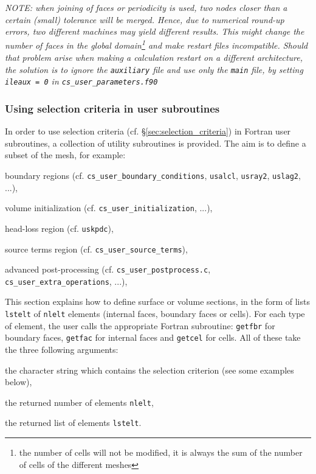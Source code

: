 {{{{\em NOTE: when joining of faces or periodicity is used, two nodes closer
than a certain (small) tolerance will be merged. Hence, due to numerical
round-up errors, two different machines may yield different results.
This might change the number of faces in the global
domain\footnote{the number of cells will not be modified, it is always the sum of the
number of cells of the different meshes} and make restart files
incompatible. Should that problem arise when making a calculation restart on a
different architecture, the solution is to ignore the \texttt{auxiliary}
file and use only the \texttt{main} file, by setting \texttt{ileaux = 0}
in \texttt{cs\_user\_parameters.f90}}

\subsubsection{Using selection criteria in user subroutines}
\label{sec:fvm_selector}

In order to use selection criteria (cf. \S\ref{sec:selection_criteria}) in Fortran
user subroutines, a collection of utility subroutines is provided. The aim is to
define a subset of the mesh, for example:

\begin{list}{-}{}
\item boundary regions (cf. \texttt{cs\_user\_boundary\_conditions}, \texttt{usalcl},
\texttt{usray2}, \texttt{uslag2}, ...),
\item volume initialization (cf. \texttt{cs\_user\_initialization}, ...),
\item head-loss region (cf. \texttt{uskpdc}),
\item source terms region (cf. \texttt{cs\_user\_source\_terms}),
\item advanced post-processing (cf. \texttt{cs\_user\_postprocess.c},
      \texttt{cs\_user\_extra\_operations}, ...),
\end{list}

This section explains how to define surface or volume sections,
in the form of lists \texttt{lstelt} of \texttt{nlelt} elements
(internal faces, boundary faces or cells).
For each type of element, the user calls the appropriate Fortran
subroutine: \texttt{getfbr}
for boundary faces, \texttt{getfac} for internal faces
and \texttt{getcel} for cells. All of these take
the three following arguments:
\begin{list}{-}{}
\item the character string which contains the selection
      criterion (see some examples below),
\item the returned number of elements \texttt{nlelt},
\item the returned list of elements \texttt{lstelt}.
\end{list}

}}}
